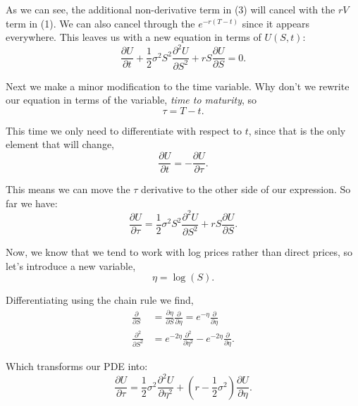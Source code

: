 \documentclass[11pt]{article}
\begin{document}
As we can see, the additional non-derivative term in (3) will cancel with the $rV$ term in (1). We can also cancel through the $e^{-r(T-t)}$ since it appears everywhere. This leaves us with a new equation in terms of $U(S,t)$:
\begin{equation}
    \frac{\partial U}{\partial t} + \frac{1}{2} \sigma^2 S^2 \frac{\partial^2 U}{\partial S^2} + rS \frac{\partial U}{\partial S} = 0.    
\end{equation}

Next we make a minor modification to the time variable. Why don't we rewrite our equation in terms of the variable, \textit{time to maturity}, so
\begin{equation}
    \tau = T - t.
\end{equation}

This time we only need to differentiate with respect to $t$, since that is the only element that will change,
\begin{equation}
    \frac{\partial U}{\partial t} = -\frac{\partial U}{\partial \tau}.
\end{equation}

This means we can move the $\tau$ derivative to the other side of our expression. So far we have:
\begin{equation}
    \frac{\partial U}{\partial \tau} = \frac{1}{2} \sigma^2 S^2 \frac{\partial^2 U}{\partial S^2} + rS \frac{\partial U}{\partial S}.    
\end{equation}

Now, we know that we tend to work with log prices rather than direct prices, so let's introduce a new variable,
\begin{equation}
    \eta = \log (S).
\end{equation}

Differentiating using the chain rule we find,
\begin{align}
    \frac{\partial}{\partial S} &= \frac{\partial \eta}{\partial S} \frac{\partial}{\partial \eta} = e^{-\eta} \frac{\partial}{\partial \eta} \\
    \frac{\partial^2}{\partial S^2} &= e^{-2\eta} \frac{\partial^2}{\partial \eta^2} - e^{-2\eta} \frac{\partial}{\partial \eta}.
\end{align}

Which transforms our PDE into:
\begin{equation}
    \frac{\partial U}{\partial \tau} = \frac{1}{2} \sigma^2 \frac{\partial^2 U}{\partial \eta^2} + \left(r - \frac{1}{2} \sigma^2 \right) \frac{\partial U}{\partial \eta}.    
\end{equation}
\end{document}
